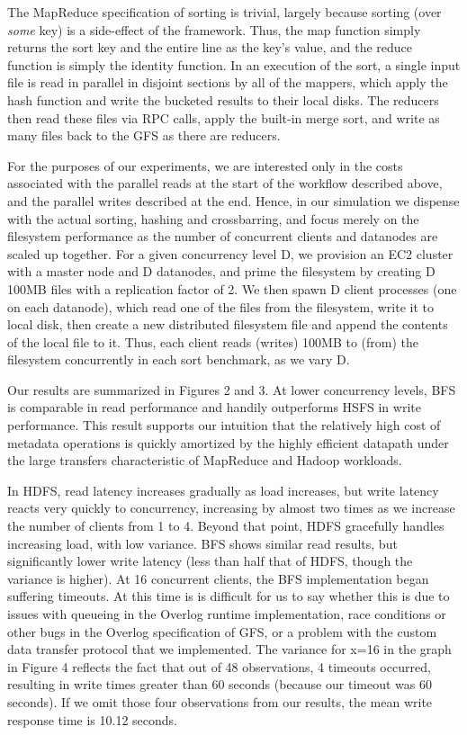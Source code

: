 \documentclass{article}
\begin{document}
The MapReduce specification of sorting is trivial, largely because sorting (over \emph{some} key) is a side-effect of the framework.  Thus, the map function simply returns the sort key and the entire line as the key's value, and the reduce function is simply the identity function.  In an execution of the sort, a single input file is read in parallel in disjoint sections by all of the mappers, which apply the hash function and write the bucketed results to their local disks.  The reducers then read these files via RPC calls, apply the built-in merge sort, and write as many files back to the GFS as there are reducers.

For the purposes of our experiments, we are interested only in the costs associated with the parallel reads at the start of the workflow described above, and the parallel writes described at the end.  Hence, in our simulation we dispense with the actual sorting, hashing and crossbarring, and focus merely on the filesystem performance as  the number of concurrent clients and datanodes are scaled up together.  For a given concurrency level D, we provision an EC2 cluster with a master node and D datanodes, and prime the filesystem by creating D 100MB files with a replication factor of 2.  We then spawn D client processes (one on each datanode), which read one of the files from the filesystem, write it to local disk, then create a new distributed filesystem file and append the contents of the local file to it.  Thus, each client reads (writes) 100MB to (from) the filesystem concurrently in each sort benchmark, as we vary D.

Our results are summarized in Figures 2 and 3.  At lower concurrency levels, BFS is comparable in read performance and handily outperforms HSFS in write performance.  This result supports our intuition that the relatively high cost of metadata operations is quickly amortized by the highly efficient datapath under the large transfers characteristic of MapReduce and Hadoop workloads.

In HDFS, read latency increases gradually as load increases, but write latency reacts very quickly to concurrency, increasing by almost two times as we increase the number of clients from 1 to 4.  Beyond that point, HDFS gracefully handles increasing load, with low variance.  BFS shows similar read results, but significantly lower write latency (less than half that of HDFS, though the variance is higher).  At 16 concurrent clients, the BFS implementation began suffering timeouts.  At this time is is difficult for us to say whether this is due to issues with queueing in the Overlog runtime implementation, race conditions or other bugs in the Overlog  specification of GFS, or a problem with the custom data transfer protocol that we implemented.  The variance for x=16 in the graph in Figure 4 reflects the fact that out of 48 observations, 4 timeouts occurred, resulting in write times greater than 60 seconds (because our timeout was 60 seconds).  If we omit those four observations from our results, the mean write response time is 10.12 seconds.
\end{document}
